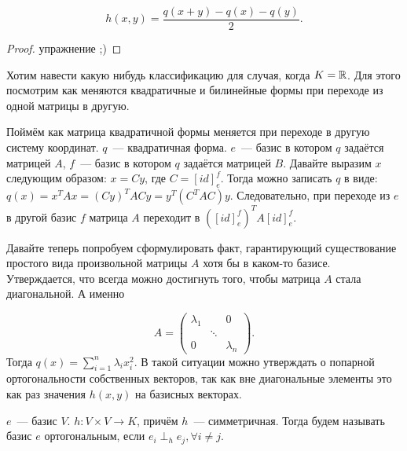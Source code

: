 \begin{statement}
     \[
             h(x, y) = \frac{q(x + y) - q(x) - q(y)}{2}
    .\] 
\end{statement}
\begin{proof}
    упражнение ;)
\end{proof}
\begin{motivation}
    Хотим навести какую нибудь классификацию для случая, когда $K = \mathbb{R}$.
    Для этого посмотрим как меняются квадратичные и билинейные формы при переходе из одной матрицы в другую.
\end{motivation}
Поймём как матрица квадратичной формы меняется при переходе в другую систему координат.
$q$~--- квадратичная форма. $e$~--- базис в котором $q$ задаётся матрицей $A$,
$f$~--- базис в котором $q$ задаётся матрицей $B$.
Давайте выразим $x$ следующим образом: $x = Cy$, где $C = [id]^f_e$.
Тогда можно записать $q$ в виде: $q(x) = x^T A x = (Cy)^T AC y = y^T (C^TAC) y$.
Следовательно, при переходе из $e$ в другой базис $f$ матрица $A$ переходит в $([id]^f_e)^T A [id]^f_e$.

Давайте теперь попробуем сформулировать факт, гарантирующий существование простого вида
произвольной матрицы $A$ хотя бы в каком-то базисе. Утверждается, что всегда можно
достигнуть того, чтобы матрица $A$ стала диагональной. А именно

\[
     A = 
     \begin{pmatrix}
         \lambda_ 1 & & 0 \\
        & \ddots & \\
        0& & \lambda_n
     \end{pmatrix}
.\] 
Тогда $q(x) = \sum\limits_{i=1}^{n}{\lambda_i x_i^2}$.
В такой ситуации можно утверждать о попарной ортогональности собственных векторов,
так как вне диагональные элементы это как раз значения $h(x,y)$ на базисных векторах.

\begin{definition}
    $e$~--- базис $V$. $h\colon V\times V\rightarrow K$, причём $h$~--- симметричная.
    Тогда будем называть базис  $e$ ортогональным, если $e_i\perp_h e_j, \forall i\not=j$.
\end{definition}
